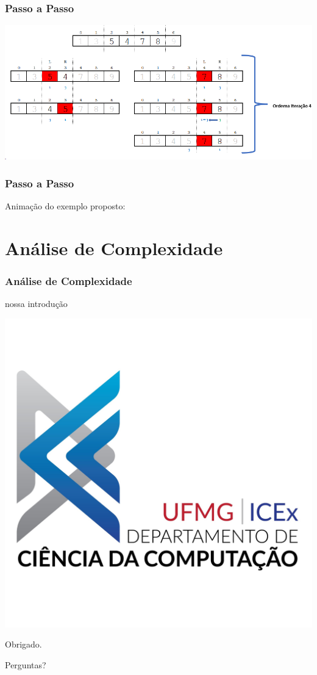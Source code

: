 \documentclass[
	11pt, %
]{beamer}
\begin{document}
\begin{frame}
	\frametitle{Passo a Passo}
	\includegraphics[width=0.9\linewidth]{o4}
\end{frame}
\begin{frame}
	\frametitle{Passo a Passo}
	\justifying
	
	Animação do exemplo proposto:
	
	\begin{center}
	\end{center}
\end{frame}

\section{Análise de Complexidade} 
\begin{frame}
	\frametitle{Análise de Complexidade}
	
	nossa introdução
	
\end{frame}



\begin{frame}[plain] %
	\begin{center}
		
		\includegraphics[width=0.3\linewidth]{logo.png}
		
		\bigskip
		
		{\Huge Obrigado.}
		
		\bigskip\bigskip %
		
		{\LARGE Perguntas?}
	\end{center}
\end{frame}

\end{document}
